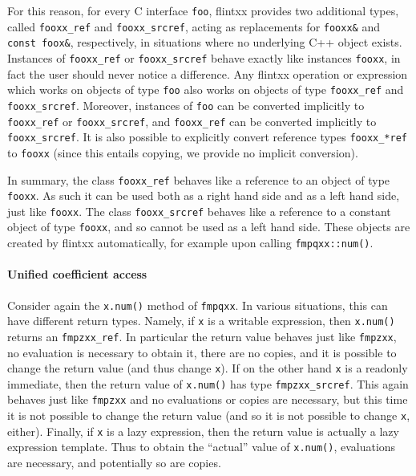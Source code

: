 \documentclass[a4paper,10pt]{book}
\newcommand{\code}{\lstinline}
\begin{document}
{{For this reason, for every C interface \code{foo}, flintxx provides two
additional types, called \code{fooxx_ref} and \code{fooxx_srcref}, acting as
replacements for \code{fooxx&} and \code{const foox&}, respectively, in
situations where no underlying C++ object exists. Instances
of \code{fooxx_ref} or \code{fooxx_srcref} behave exactly like instances
\code{fooxx}, in fact the user should never notice a difference. Any flintxx
operation or expression which works on objects of type \code{foo} also works on
objects of type \code{fooxx_ref} and \code{fooxx_srcref}. Moreover, instances
of \code{foo} can be converted implicitly to \code{fooxx_ref} or
\code{fooxx_srcref}, and \code{fooxx_ref} can be converted implicitly to
\code{fooxx_srcref}. It is also possible to explicitly convert reference types
\code{fooxx_*ref} to \code{fooxx} (since this entails copying, we provide no
implicit conversion).

In summary, the class \code{fooxx_ref} behaves like a reference to an object of
type \code{fooxx}. As such it can be used both as a right hand side and as a
left hand side, just like \code{fooxx}. The class \code{fooxx_srcref} behaves
like a reference to a constant object of type \code{fooxx}, and so cannot be
used as a left hand side. These objects are created by flintxx automatically,
for example upon calling \code{fmpqxx::num()}.

\paragraph{Unified coefficient access}

Consider again the \code{x.num()} method of \code{fmpqxx}. In various
situations,
this can have different return types. Namely, if \code{x} is a writable
expression, then \code{x.num()} returns an \code{fmpzxx_ref}. In
particular the return value behaves just like \code{fmpzxx}, no evaluation is
necessary to obtain it, there are no copies, and it is possible to change the
return value (and thus change \code{x}). If on the other hand \code{x} is a
readonly immediate,
then the return value of \code{x.num()} has type
\code{fmpzxx_srcref}. This again behaves just like \code{fmpzxx} and no
evaluations or copies are necessary, but this time it is not possible to change
the return value (and so it is not possible to change \code{x}, either).
Finally, if \code{x} is a lazy expression, then
the return value is actually a lazy expression template. Thus to obtain the
``actual'' value of \code{x.num()}, evaluations are necessary, and potentially
so are copies.

}}
\end{document}
